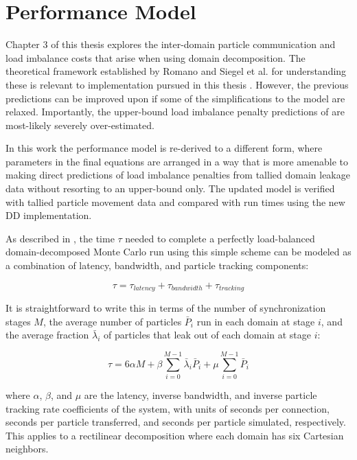 \documentclass[12pt,twoside]{mitthesis-exec}
\begin{document}
\section*{Performance Model}

Chapter 3 of this thesis explores the inter-domain particle communication and
load imbalance costs that arise when using domain decomposition. The theoretical
framework established by Romano and Siegel et al. for understanding these is
relevant to implementation pursued in this thesis \cite{Siegel1,
Siegel2, romano_thesis}. However, the previous predictions can be improved upon if some of the
simplifications to the model are relaxed. Importantly, the upper-bound load
imbalance penalty predictions of \cite{Siegel2} are most-likely severely
over-estimated.

In this work the performance model is re-derived to a different form, where
parameters in the final equations are arranged in a way that is more amenable to
making direct predictions of load imbalance penalties from tallied domain
leakage data without resorting to an upper-bound only. The updated model is
verified with tallied particle movement data and compared with run times using
the new DD implementation.

As described in \cite{Siegel2}, the time $\tau$ needed to complete a perfectly
load-balanced domain-decomposed Monte Carlo run using this simple scheme can be
modeled as a combination of latency, bandwidth, and particle tracking
components:

\begin{equation}
    \tau = \tau_{latency} + \tau_{bandwidth} + \tau_{tracking}
    \label{eqn:baltime_high-level}
\end{equation}

It is straightforward to write this in terms of the number of synchronization
stages $M$, the average number of particles $\bar P_i$ run in each domain at
stage $i$, and the average fraction $\bar \lambda_i$ of particles that leak out
of each domain at stage $i$:

\begin{equation}
    \tau = 6\alpha M + \beta \sum_{i=0}^{M-1} \bar\lambda_i \bar{P}_i + \mu \sum_{i=0}^{M-1} \bar{P}_i
    \label{eqn:baltime}
\end{equation}

\noindent where $\alpha$, $\beta$, and $\mu$ are the latency, inverse bandwidth,
and inverse particle tracking rate coefficients of the system, with units of
seconds per connection, seconds per particle transferred, and seconds per
particle simulated, respectively. This applies to a rectilinear decomposition
where each domain has six Cartesian neighbors.
\end{document}
